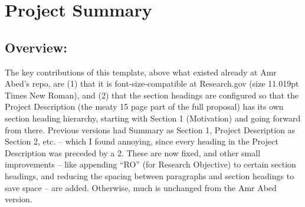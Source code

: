 \section*{\hfil Project Summary\hfil}
\vspace{-16pt}
\noindent\hrulefill





\vspace{-8pt}
\subsection*{Overview:} 
\vspace{-7pt}

The key contributions of this template, above what existed already at Amr Abed's repo, are (1) that it is font-size-compatible at Research.gov (size 11.019pt Times New Roman), and (2) that the section headings are configured so that the Project Description (the meaty 15 page part of the full proposal) has its own section heading hierarchy, starting with Section 1 (Motivation) and going forward from there.  Previous versions had Summary as Section 1, Project Description as Section 2, etc. -- which I found annoying, since every heading in the Project Description was preceded by a 2.  These are now fixed, and other small improvements -- like appending ``RO'' (for Research Objective) to certain section headings, and reducing the spacing between paragraphs and section headings to save space -- are added.  Otherwise, much is unchanged from the Amr Abed version.

